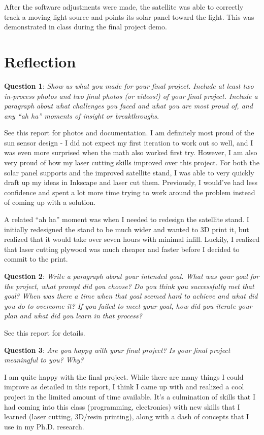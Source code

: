 After the software adjustments were made, the satellite was able to correctly track a moving light source and points its solar panel toward the light. This was demonstrated in class during the final project demo. 


\section{Reflection}
\label{sec:reflection}

\textbf{Question 1}: \textit{Show us what you made for your final project.  Include at least two in-process photos and two final photos (or videos!) of your final project. Include a paragraph about what challenges you faced and what you are most proud of, and any ``ah ha'' moments of insight or breakthroughs.}

See this report for photos and documentation. I am definitely most proud of the sun sensor design - I did not expect my first iteration to work out so well, and I was even more surprised when the math also worked first try. However, I am also very proud of how my laser cutting skills improved over this project. For both the solar panel supports and the improved satellite stand, I was able to very quickly draft up my ideas in Inkscape and laser cut them. Previously, I would've had less confidence and spent a lot more time trying to work around the problem instead of coming up with a solution. 

A related ``ah ha'' moment was when I needed to redesign the satellite stand. I initially redesigned the stand to be much wider and wanted to 3D print it, but realized that it would take over seven hours with minimal infill. Luckily, I realized that laser cutting plywood was much cheaper and faster before I decided to commit to the print. 

\textbf{Question 2}: \textit{Write a paragraph about your intended goal. What was your goal for the project, what prompt did you choose? Do you think you successfully met that goal? When was there a time when that goal seemed hard to achieve and what did you do to overcome it? If you failed to meet your goal, how did you iterate your plan and what did you learn in that process? }

See this report for details.

\textbf{Question 3}: \textit{Are you happy with your final project? Is your final project meaningful to you? Why?}

I am quite happy with the final project. While there are many things I could improve as detailed in this report, I think I came up with and realized a cool project in the limited amount of time available. It's a culmination of skills that I had coming into this class (programming, electronics) with new skills that I learned (laser cutting, 3D/resin printing), along with a dash of concepts that I use in my Ph.D. research. 

